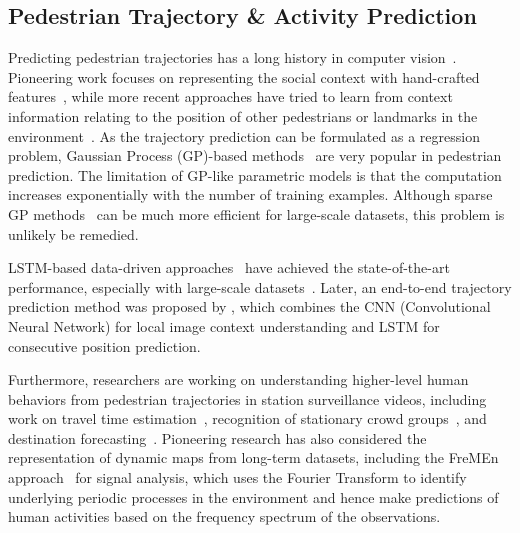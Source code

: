 \documentclass[letterpaper, 10 pt, conference]{ieeeconf}  %
\begin{document}
\subsection{Pedestrian Trajectory \& Activity Prediction}
Predicting pedestrian trajectories has a long history in computer vision~\cite{UCY,ETH,IGP,yamaguchi2011you,social-lstm,context-lstm,SDD}.
Pioneering work focuses on representing the social context with hand-crafted features~\cite{UCY,ETH,IGP,yamaguchi2011you}, while more recent approaches have tried to learn from context information relating to the position of other pedestrians or landmarks in the environment~\cite{social-lstm,context-lstm}.
As the trajectory prediction can be formulated as a regression problem, Gaussian Process (GP)-based methods~\cite{IGP,sparse-GP} are very popular in pedestrian prediction.
The limitation of GP-like parametric models is that the computation increases exponentially with the number of training examples.
Although sparse GP methods~\cite{sparse-GP} can be much more efficient for large-scale datasets, this problem is unlikely be remedied.

LSTM-based data-driven approaches~\cite{social-lstm,context-lstm} have achieved the state-of-the-art performance, especially with large-scale datasets~\cite{SDD}. 
Later, an end-to-end trajectory prediction method was proposed by \cite{varshneya2017human}, which combines the CNN (Convolutional Neural Network) for local image context understanding and LSTM for consecutive position prediction. 

Furthermore, researchers are working on understanding higher-level human behaviors from pedestrian trajectories in station surveillance videos, including work on travel time estimation~\cite{yi2015pedestrian}, recognition of stationary crowd groups~\cite{yi2016pedestrian}, and destination forecasting~\cite{alahi2014socially}.
Pioneering research has also considered the representation of dynamic maps from long-term datasets, 
including the FreMEn approach~\cite{fremen} for signal analysis, which uses the Fourier Transform to identify underlying periodic processes in the environment and hence make predictions of human activities based on the frequency spectrum of the observations.
\end{document}
